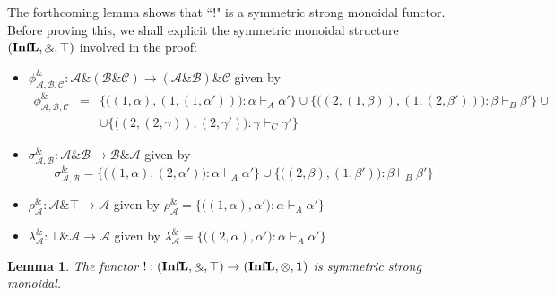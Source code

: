 \documentclass[copyright,creativecommons]{eptcs}
\newtheorem{lemma}[theorem]{Lemma}
\newcommand{\cA}{\mathcal{A}}
\newcommand{\cB}{\mathcal{B}}
\newcommand{\cC}{\mathcal{C}}
\newcommand{\ga}{\alpha}
\newcommand{\gb}{\beta}
\newcommand{\gc}{\gamma}
\begin{document}
The forthcoming lemma shows that ``$!$" is a symmetric strong monoidal functor. Before proving this, we shall explicit the symmetric monoidal structure $(\mathbf{InfL}, \binampersand, \top)$ involved in the proof:
\begin{itemize}
\item $\phi_{\cA,\cB,\cC}^\binampersand : \cA \binampersand (\cB \binampersand \cC) \to (\cA \binampersand \cB) \binampersand \cC$ given by 
\begin{eqnarray*}
\phi_{\cA,\cB,\cC}^\binampersand & = & \big\{\big((1,\ga), (1,(1,\ga'))\big) : \ga \vdash_{A} \ga' \big\} \cup \big\{\big((2,(1,\gb)), (1,(2,\gb'))\big) : \gb \vdash_{B} \gb' \big\} \cup \\
 &  & \cup \big\{\big((2,(2,\gc)), (2,\gc')\big) : \gc \vdash_{C} \gc' \big\}
\end{eqnarray*}

\item $\sigma_{\cA,\cB}^\binampersand: \cA \binampersand \cB \to \cB \binampersand \cA$ given by 
$$ \sigma_{\cA,\cB}^\binampersand = \big\{\big((1,\ga), (2,\ga')\big) : \ga \vdash_{A} \ga' \big\} \cup \big\{\big((2,\gb), (1,\gb')\big) : \gb \vdash_{B} \gb' \big\} $$

\item $\rho_\cA^\binampersand: \cA \binampersand \top \to \cA$ given by $\rho_\cA^\binampersand = \big\{\big((1,\ga),\ga' \big) : \ga \vdash_A \ga' \big\}$

\item $\lambda_\cA^\binampersand: \top \binampersand \cA \to \cA$ given by $\lambda_\cA^\binampersand = \big\{\big((2,\ga),\ga' \big) : \ga \vdash_A \ga' \big\}$
\end{itemize}

\bigskip

\begin{lemma}\label{SSMF}
The functor $!: (\mathbf{InfL}, \binampersand, \top) \to (\mathbf{InfL}, \otimes, \mathbf{1})$ is symmetric strong monoidal.
\end{lemma}
\end{document}
